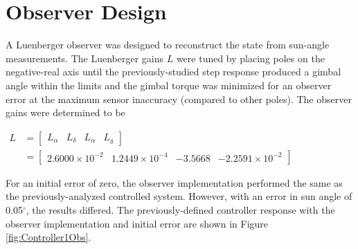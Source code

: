 \documentclass[]{aiaa-tc}%
\begin{document}
	\section{Observer Design}

	A Luenberger observer was designed to reconstruct the state from sun-angle measurements. The Luenberger gains $L$ were tuned by placing poles on the negative-real axis until the previously-studied step response produced a gimbal angle within the limits and the gimbal torque was minimized for an observer error at the maximum sensor inaccuracy (compared to other poles). The observer gains were determined to be

	\vspace{5 mm}

{\centering
 $\begin{aligned}
L &= \begin{bmatrix}
L_{\alpha} & L_{\delta} & L_{\dot{\alpha}} & L_{\dot{\delta}} 
\end{bmatrix}\\ 
 &= \begin{bmatrix}
2.6000\times10^{-2} & 1.2449\times10^{-4} & -3.5668 & -2.2591\times10^{-2} 
\end{bmatrix}
\end{aligned}$\par
}

	\vspace{5 mm}

	For an initial error of zero, the observer implementation performed the same as the previously-analyzed controlled system. However, with an error in sun angle of 0.05$^{\circ}$, the results differed. The previously-defined controller response with the observer implementation and initial error are shown in Figure  \ref{fig:Controller1Obs}.
\end{document}
